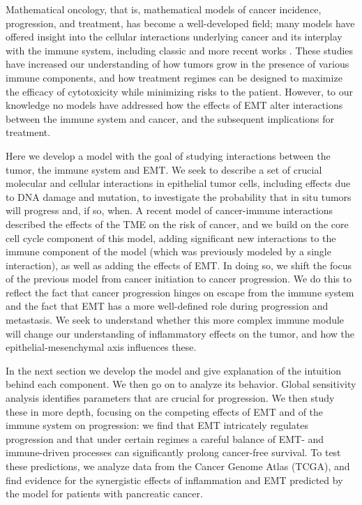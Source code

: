 \documentclass[11pt]{article}
\begin{document}
Mathematical oncology, that is, mathematical models of cancer incidence, progression, and treatment, has become a well-developed field; many models have offered insight into the cellular interactions underlying cancer and its interplay with the immune system, including classic \cite{anderson98_continuous, sherrattjonathana.92_oncogenes, pillis05_validated} and more recent works \cite{kim18_cell, gallaher14_bridging, gallaher18_spatial, an15_agentbased, serre16_mathematical, louzoun14_mathematical, briones-orta13_arkadia, lavi13_role, greene15_modeling, greene16_mathematical, cho17_modeling-1,  benzekry17_mathematical, owen11_mathematical, west18_multidrug}. These studies have increased our understanding of how tumors grow in the presence of various immune components, and how treatment regimes can be designed to maximize the efficacy of cytotoxicity while minimizing risks to the patient. However, to our knowledge no models have addressed how the effects of EMT alter interactions between the immune system and cancer, and the subsequent implications for treatment. 
\par
Here we develop a model with the goal of studying interactions between the tumor, the immune system and EMT.
We seek to describe a set of crucial molecular and cellular interactions in epithelial tumor cells, including effects due to DNA damage and mutation, to investigate the probability that in situ tumors will progress and, if so, when.
A recent model of cancer-immune interactions \cite{guo17_multiscale} described the effects of the TME on the risk of cancer, and we build on the core cell cycle component of this model, adding significant new interactions to the immune component of the model (which was previously modeled by a single interaction), as well as adding the effects of EMT.
In doing so, we shift the focus of the previous model from cancer initiation to cancer progression.
We do this to reflect the fact that cancer progression hinges on escape from the immune system and the fact that EMT has a more well-defined role during progression and metastasis.
We seek to understand whether this more complex immune module will change our understanding of inflammatory effects on the tumor, and how the epithelial-mesenchymal axis influences these.
\par 
In the next section we develop the model and give explanation of the intuition behind each component.
We then go on to analyze its behavior.
Global sensitivity analysis identifies parameters that are crucial for progression.
We then study these in more depth, focusing on the competing effects of EMT and of the immune system on progression: we find that EMT intricately regulates progression and that under certain regimes a careful balance of EMT- and immune-driven processes can significantly prolong cancer-free survival.
To test these predictions, we analyze data from the Cancer Genome Atlas (TCGA), and find evidence for the synergistic effects of inflammation and EMT predicted by the model for patients with pancreatic cancer.
\end{document}
